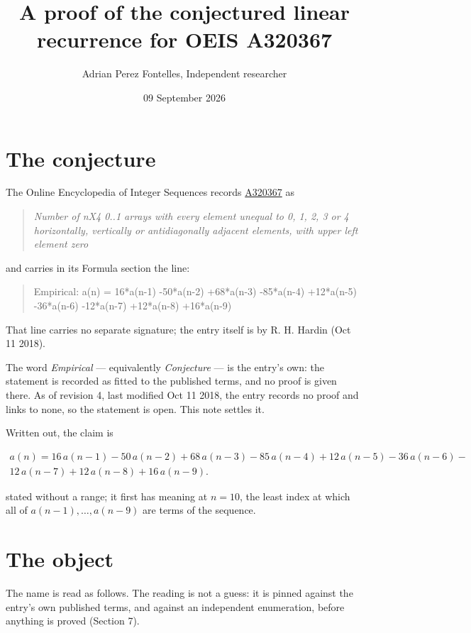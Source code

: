 \documentclass[11pt]{article}
\title{A proof of the conjectured linear recurrence for OEIS A320367}
\author{Adrian Perez Fontelles, Independent researcher}
\date{09 September 2026}
\theoremstyle{definition}
\begin{document}
\maketitle
\section{The conjecture}

The Online Encyclopedia of Integer Sequences records \href{https://oeis.org/A320367}{A320367} as

\begin{quote}\itshape Number of nX4 0..1 arrays with every element unequal to 0, 1, 2, 3 or 4 horizontally, vertically or antidiagonally adjacent elements, with upper left element zero\end{quote}

and carries in its Formula section the line:

\begin{quote}\ttfamily Empirical: a(n) = 16*a(n-1) -50*a(n-2) +68*a(n-3) -85*a(n-4) +12*a(n-5) -36*a(n-6) -12*a(n-7) +12*a(n-8) +16*a(n-9)\end{quote}

That line carries no separate signature; the entry itself is by R. H. Hardin (Oct 11 2018).

The word {\itshape Empirical} --- equivalently {\itshape Conjecture} --- is the entry's own: the statement is recorded as fitted to the published terms, and no proof is given there. As of revision 4, last modified Oct 11 2018, the entry records no proof and links to none, so the statement is open. This note settles it.

Written out, the claim is

\begin{multline*} a(n) = 16\,a(n-1) - 50\,a(n-2) + 68\,a(n-3) - 85\,a(n-4) + 12\,a(n-5) - 36\,a(n-6) - \\ 12\,a(n-7) + 12\,a(n-8) + 16\,a(n-9). \end{multline*}

stated without a range; it first has meaning at $n = 10$, the least index at which all of $a(n-1),\dots,a(n-9)$ are terms of the sequence.

\section{The object}

The name is read as follows. The reading is not a guess: it is pinned against the entry's own published terms, and against an independent enumeration, before anything is proved (Section 7).
\end{document}
